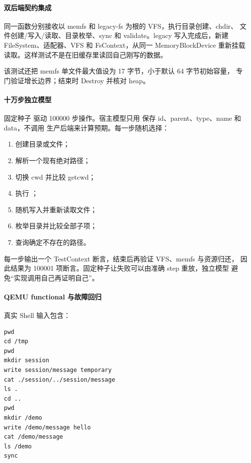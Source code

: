 \paragraph{双后端契约集成}

同一函数分别接收以 memfs 和 legacy-fs 为根的 VFS，执行目录创建、chdir、
文件创建/写入/读取、目录枚举、sync 和 validate。legacy 写入完成后，新建
FileSystem、适配器、VFS 和 FsContext，从同一 MemoryBlockDevice 重新挂载
读取。这样测试不是在旧缓存里读回自己刚写的数据。

该测试还把 memfs 单文件最大值设为 17 字节，小于默认 64 字节初始容量，
专门验证增长边界；结束时 Destroy 并核对 heap。

\paragraph{十万步独立模型}

固定种子  驱动 100000 步操作。宿主模型只用
 保存 id、parent、type、name 和 data，不调用
生产后端来计算预期。每一步随机选择：

\begin{enumerate}
  \item 创建目录或文件；
  \item 解析一个现有绝对路径；
  \item 切换 cwd 并比较 getcwd；
  \item 执行 ；
  \item 随机写入并重新读取文件；
  \item 枚举目录并比较全部子项；
  \item 查询确定不存在的路径。
\end{enumerate}

每一步输出一个 TestContext 断言，结束后再验证 VFS、memfs 与资源归还，
因此结果为 100001 项断言。固定种子让失败可以由准确 step 重放，独立模型
避免“实现调用自己再证明自己”。

\paragraph{QEMU functional 与故障回归}

真实 Shell 输入包含：

\begin{lstlisting}
pwd
cd /tmp
pwd
mkdir session
write session/message temporary
cat ./session/../session/message
ls .
cd ..
pwd
mkdir /demo
write /demo/message hello
cat /demo/message
ls /demo
sync
\end{lstlisting}

